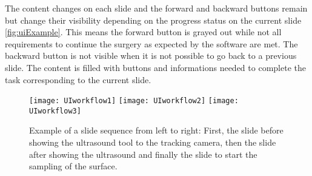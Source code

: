 The content changes on each slide and the forward and backward buttons
remain but change their visibility depending on the progress status on the
current slide \ref{fig:uiExample}. This means the forward button is grayed out while not all requirements to continue the surgery as
expected by the software are met. The backward button is not visible when it is
not possible to go back to a previous slide. The content is filled with buttons
and informations needed to complete the task corresponding to the current slide.



\begin{figure}[H]
  \centering
  \texttt{[image: UIworkflow1]} 
  \endminipage
  \hfill
  \texttt{[image: UIworkflow2]}
  \endminipage
  \hfill
  \texttt{[image: UIworkflow3]}
  \endminipage
  \hfill 
 \caption{Example of a slide sequence from left to right: First, the slide
   before showing the ultrasound tool to the tracking camera, then the slide
   after showing the ultrasound and finally the slide to start the sampling of
   the surface.}
  \label{fig:workflowExample}
\end{figure}
